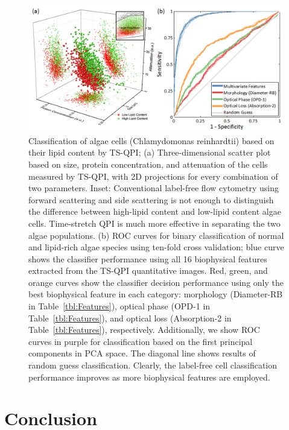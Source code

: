 \documentclass[aps,pra,reprint,superscriptaddress]{revtex4-1}
\begin{document}
\begin{figure}
\includegraphics[scale=0.2]{FigureAlgae.jpg}
\caption{\label{fig:AlgaeScatter} Classification of algae cells (Chlamydomonas reinhardtii) based on their lipid content by TS-QPI; (a) Three-dimensional scatter plot based on size, protein concentration, and attenuation of the cells measured by TS-QPI, with 2D projections for every combination of two parameters. Inset: Conventional label-free flow cytometry using forward scattering and side scattering is not enough to distinguish the difference between high-lipid content and low-lipid content algae cells. Time-stretch QPI is much more effective in separating the two algae populations. (b) ROC curves for binary classification of normal and lipid-rich algae species using ten-fold cross validation; blue curve shows the classifier performance using all 16 biophysical features extracted from the TS-QPI quantitative images. Red, green, and orange curves show the classifier decision performance using only the best biophysical feature in each category: morphology (Diameter-RB in Table~\ref{tbl:Features}), optical phase (OPD-1 in Table~\ref{tbl:Features}), and optical loss (Absorption-2 in Table~\ref{tbl:Features}), respectively. Additionally, we show ROC curves in purple for classification based on the first principal components in PCA space. The diagonal line shows results of random guess classification. Clearly, the label-free cell classification performance improves as more biophysical features are employed.}
\end{figure}

\section{Conclusion}
\end{document}
